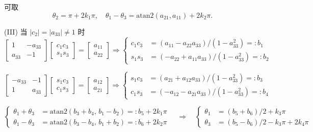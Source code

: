 可取
\begin{equation}
    \theta_2 = \pi + 2k_1\pi,\quad \theta_1 - \theta_3 = \mathrm{atan2}(a_{21}, a_{11}) + 2k_2\pi.
\end{equation}

(III) 当 $|c_2| = |a_{33}| \neq 1$ 时
\begin{equation}
    \begin{bmatrix}
        1 & -a_{33}\\
        a_{33} & -1
    \end{bmatrix}
    \begin{bmatrix}
        c_1c_3\\
        s_1s_3
    \end{bmatrix}
    = \begin{bmatrix}
        a_{11}\\
        a_{22}
    \end{bmatrix}
    \Rightarrow \left\{\begin{aligned}
        c_1c_3 &= (a_{11} - a_{22}a_{33})/(1-a_{33}^2) =: b_1\\
        s_1s_3 &= (-a_{22} + a_{11}a_{33})/(1-a_{33}^2) =: b_2
    \end{aligned}\right.
\end{equation}

\begin{equation}
    \begin{bmatrix}
        -a_{33} & -1\\
        1 & a_{33}
    \end{bmatrix}
    \begin{bmatrix}
        s_1c_3\\
        c_1s_3
    \end{bmatrix}
    = \begin{bmatrix}
        a_{12}\\
        a_{21}
    \end{bmatrix}
    \Rightarrow \left\{\begin{aligned}
        s_1c_3 &= (a_{21} + a_{12}a_{33})/(1-a_{33}^2) =: b_3\\
        c_1s_3 &= (-a_{12} - a_{21}a_{33})/(1-a_{33}^2) =: b_4
    \end{aligned}\right.
\end{equation}

\begin{equation}
    \left\{\begin{aligned}
        \theta_1 + \theta_3 &= \mathrm{atan2}(b_3 + b_4,\, b_1 - b_2) =: b_5 + 2k_1\pi\\
        \theta_1 - \theta_3 &= \mathrm{atan2}(b_3 - b_4,\, b_1 + b_2) =: b_6 + 2k_2\pi
    \end{aligned}\right.
    \quad\Rightarrow\quad
    \left\{\begin{aligned}
        \theta_1 &= (b_5 + b_6)/2 + k_3\pi\\
        \theta_3 &= (b_5 - b_6)/2 - k_3\pi + 2k_4\pi
    \end{aligned}\right.
\end{equation}

